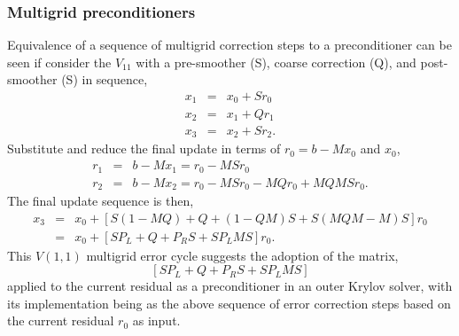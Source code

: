 \documentclass[pdf,ps,8pt]{beamer}
\newcommand{\beq}{\begin{equation*}}
\newcommand{\eeq}{\end{equation*}}
\begin{document}
\begin{frame}[fragile]\small\frametitle{Multigrid preconditioners}

Equivalence of a sequence of multigrid correction steps to a preconditioner can be seen if consider the $V_{11}$
with a pre-smoother (S), coarse correction (Q), and post-smoother (S) in sequence,
\begin{eqnarray}
x_1 &=& x_0 + S r_0 \\
x_2 &=& x_1 + Q r_1 \\
x_3 &=& x_2 + S r_2 .
\end{eqnarray}
Substitute and reduce the final update in terms of $r_0 = b - M x_0$ and $x_0$,
\begin{eqnarray}
  r_1 &=& b-M x_1 = r_0 - M S r_0 \\
  r_2 &=& b-M x_2 = r_0 - M S r_0  - M Q r_0 + M Q M S r_0 .
\end{eqnarray}
The final update sequence is then,
\begin{eqnarray}
  x_3 &=& x_0 + \left[ S (1 - MQ ) + Q + (1 - QM) S  + S( M Q M - M) S  \right]r_0\\
      &=& x_0 + \left[ S P_L + Q + P_R S  + S P_L M S  \right]r_0 .
\end{eqnarray}
This $V(1,1)$ multigrid error cycle suggests the adoption of the matrix,
\beq
\left[ S P_L + Q + P_R S  + S P_L M S  \right]
\eeq
applied to the current residual as a preconditioner in an outer Krylov solver, with its implementation
being as the above sequence of error correction steps based on the current residual $r_0$ as input.

\end{frame}
\end{document}
